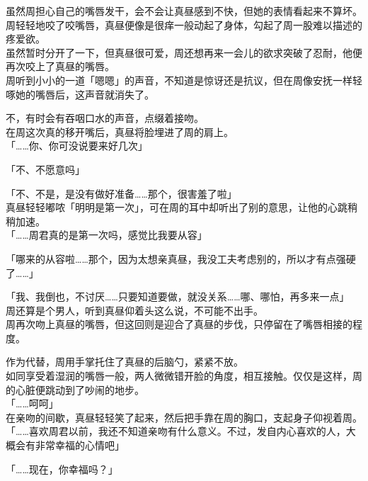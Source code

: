 虽然周担心自己的嘴唇发干，会不会让真昼感到不快，但她的表情看起来不算坏。周轻轻地咬了咬嘴唇，真昼便像是很痒一般动起了身体，勾起了周一股难以描述的疼爱欲。\\

虽然暂时分开了一下，但真昼很可爱，周还想再来一会儿的欲求突破了忍耐，他便再次咬上了真昼的嘴唇。\\

周听到小小的一道「嗯嗯」的声音，不知道是惊讶还是抗议，但在周像安抚一样轻啄她的嘴唇后，这声音就消失了。

不，有时会有吞咽口水的声音，点缀着接吻。\\

在周这次真的移开嘴后，真昼将脸埋进了周的肩上。\\

「……你、你可没说要来好几次」

「不、不愿意吗」

「不、不是，是没有做好准备……那个，很害羞了啦」\\

真昼轻轻嘟哝「明明是第一次」，可在周的耳中却听出了别的意思，让他的心跳稍稍加速。\\

「……周君真的是第一次吗，感觉比我要从容」

「哪来的从容啦……那个，因为太想亲真昼，我没工夫考虑别的，所以才有点强硬了……」

「我、我倒也，不讨厌……只要知道要做，就没关系……哪、哪怕，再多来一点」\\

周还算是个男人，听到真昼仰着头这么说，不可能不出手。\\

周再次吻上真昼的嘴唇，但这回则是迎合了真昼的步伐，只停留在了嘴唇相接的程度。

作为代替，周用手掌托住了真昼的后脑勺，紧紧不放。\\

如同享受着湿润的嘴唇一般，两人微微错开脸的角度，相互接触。仅仅是这样，周的心脏便跳动到了吵闹的地步。\\

「……呵呵」\\

在亲吻的间歇，真昼轻轻笑了起来，然后把手靠在周的胸口，支起身子仰视着周。\\

「……喜欢周君以前，我还不知道亲吻有什么意义。不过，发自内心喜欢的人，大概会有非常幸福的心情吧」

「……现在，你幸福吗？」

